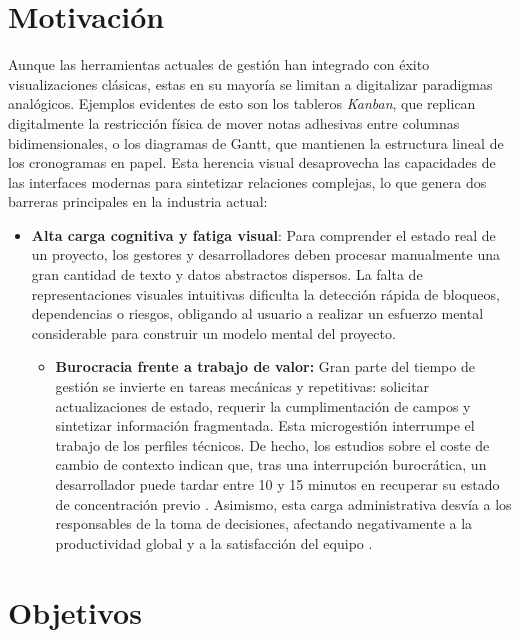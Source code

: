 \section{Motivación}
\label{sec:motivacion_objetivos}

Aunque las herramientas actuales de gestión han integrado con éxito visualizaciones clásicas, estas en su mayoría se limitan a digitalizar paradigmas analógicos. Ejemplos evidentes de esto son los tableros \emph{Kanban}, que replican digitalmente la restricción física de mover notas adhesivas entre columnas bidimensionales, o los diagramas de Gantt, que mantienen la estructura lineal de los cronogramas en papel. Esta herencia visual desaprovecha las capacidades de las interfaces modernas para sintetizar relaciones complejas, lo que genera dos barreras principales en la industria actual:

\begin{itemize}
    \item \textbf{Alta carga cognitiva y fatiga visual}: Para comprender el estado real de un proyecto, los gestores y desarrolladores deben procesar manualmente una gran cantidad de texto y datos abstractos dispersos. La falta de representaciones visuales intuitivas dificulta la detección rápida de bloqueos, dependencias o riesgos, obligando al usuario a realizar un esfuerzo mental considerable para construir un modelo mental del proyecto.
    \begin{itemize}
    \item \textbf{Burocracia frente a trabajo de valor:} Gran parte del tiempo de gestión se invierte en tareas mecánicas y repetitivas: solicitar actualizaciones de estado, requerir la cumplimentación de campos y sintetizar información fragmentada. Esta microgestión interrumpe el trabajo de los perfiles técnicos. De hecho, los estudios sobre el coste de cambio de contexto indican que, tras una interrupción burocrática, un desarrollador puede tardar entre 10 y 15 minutos en recuperar su estado de concentración previo \cite{parnin2011resumption}. Asimismo, esta carga administrativa desvía a los responsables de la toma de decisiones, afectando negativamente a la productividad global y a la satisfacción del equipo \cite{forsgren2021space}.
\end{itemize}
\end{itemize}

\section{Objetivos}

